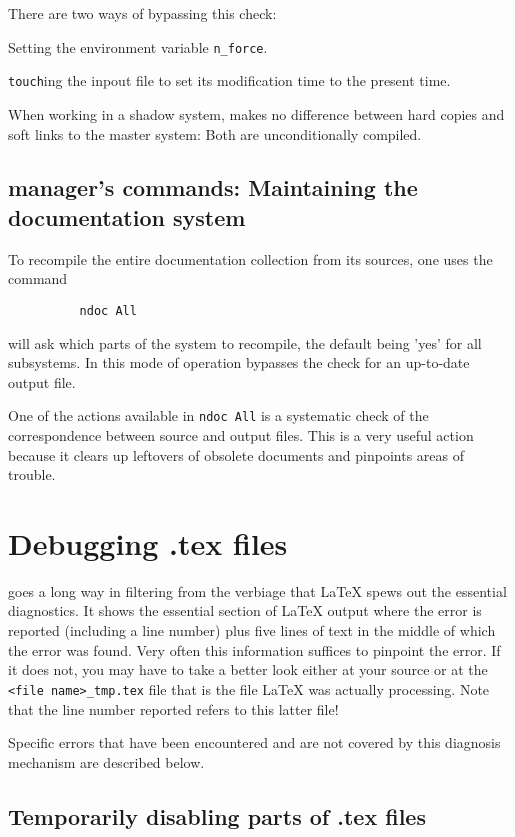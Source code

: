         There are two ways of bypassing this check: 
\bi 
\item   Setting the environment variable \verb/n_force/. 
\item   \verb/touch/ing the inpout file to set its modification time to the
present time. 
\ei 

        When working in a shadow system, \ndoc makes no difference between hard
copies and soft links to the master system: Both are unconditionally compiled. 


\subsection{ \NEWSTAR manager's commands: Maintaining the documentation system
} 

        To recompile the entire documentation collection from its sources, one
uses the command 

\verb/          ndoc All/ 

\noindent \ndoc will ask which parts of the system to recompile, the default
being 'yes' for all subsystems. In this mode of operation \ndoc bypasses the
check for an up-to-date output file. 

        One of the actions available in \verb/ndoc All/ is a systematic check
of the correspondence between source and output files. This is a very useful
action because it clears up leftovers of obsolete documents and pinpoints areas
of trouble. 




\section{ Debugging .tex files} 

        \ndoc goes a long way in filtering from the verbiage that LaTeX spews
out the essential diagnostics. It shows the essential section of LaTeX output
where the error is reported (including a line number) plus five lines of text
in the middle of which the error was found. Very often this information
suffices to pinpoint the error. If it does not, you may have to take a better
look either at your source or at the \verb/<file name>_tmp.tex/ file that is
the file LaTeX was actually processing. Note that the line number reported
refers to this latter file! 

        Specific errors that have been encountered and are not covered by this
diagnosis mechanism are described below. 


\subsection{ Temporarily disabling parts of .tex files} 

